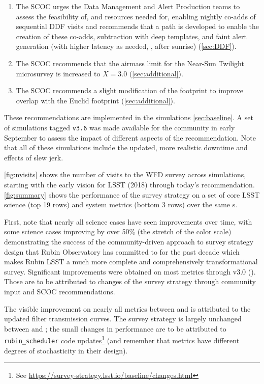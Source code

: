 \begin{enumerate}
\item The SCOC urges the Data Management and Alert Production teams to assess the feasibility of, and resources needed for, enabling nightly co-adds of sequential DDF visits and recommends that a path is developed to enable the creation of these co-adds, subtraction with deep templates, and faint alert generation (with higher latency as needed, \eg , after sunrise) (\autoref{sec:DDF}). 

\item The SCOC recommends that the airmass limit for the Near-Sun Twilight microsurvey is increased to $X=3.0$ (\autoref{sec:additional}).

\item The SCOC recommends a slight modification of the  footprint to improve overlap with the Euclid footprint (\autoref{sec:additional}). 

\end{enumerate}

These recommendations are implemented in the  simulations \autoref{sec:baseline}. A set of simulations tagged \texttt{v3.6} was made available for the community in early September to assess the impact of different aspects of the recommendation. Note that all of these simulations include the updated, more realistic downtime and effects of slew jerk. 

 \autoref{fig:nvisits} shows the number of visits to the WFD survey across simulations, starting with the early vision for LSST (2018) through today's recommendation. \autoref{fig:summary} shows the performance of the survey strategy on a set of core LSST science (top 19 rows) and system metrics (bottom 3 rows) over the same \opsim s. 
 
 First, note that nearly all science cases have seen improvements over time, with some science cases improving by over 50\% (the stretch of the color scale) demonstrating the success of the 
 community-driven approach to survey strategy design that Rubin Observatory has committed to for the past decade which makes Rubin LSST a much more complete and comprehensively transformational survey. Significant improvements were obtained on most metrics through v3.0 (). Those are to be attributed to changes of the survey strategy through community input and SCOC recommendations. 
 
 The visible improvement on nearly all metrics between  and  is attributed to the updated filter transmission curves. The survey strategy is largely unchanged between  and ; the small changes in performance are to be attributed to  \texttt{rubin\_scheduler} code updates\footnote{See \url{https://survey-strategy.lsst.io/baseline/changes.html}} (and remember that metrics have different degrees of stochasticity in their design). 
 
